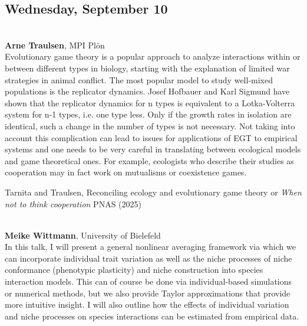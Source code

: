 \documentclass[12pt,a4paper]{article}
\begin{document}
\subsection*{\sffamily Wednesday, September 10}
\bigskip\bigskip
{}\\[1ex]{ \large \textbf{ Arne Traulsen}}, MPI Plön \\[2ex] Evolutionary game theory is a popular approach to analyze interactions within or between different types in biology, starting with the explanation of limited war strategies in animal conflict. The most popular model to study well-mixed populations is the replicator dynamics. Josef Hofbauer and Karl Sigmund have shown that the replicator dynamics for n types is equivalent to a Lotka-Volterra system for n-1 types, i.e. one type less. Only if the growth rates in isolation are identical, such a change in the number of types is not necessary. Not taking into account this complication can lead to issues for applications of EGT to empirical systems and one needs to be very careful in translating between ecological models and game theoretical ones. For example, ecologists who describe their studies as cooperation may in fact work on mutualisms or coexistence games. 

 Tarnita and Traulsen, Reconciling ecology and evolutionary game theory or {\em When not to think cooperation} PNAS (2025) 

\bigskip\bigskip

\\[1ex]{ \large \textbf{ Meike Wittmann}}, University of Bielefeld \\[2ex] In this talk, I will present a general nonlinear averaging framework via which we can incorporate individual trait variation as well as the niche processes of niche conformance (phenotypic plasticity) and niche construction into species interaction models. This can of course be done via individual-based simulations or numerical methods, but we also provide Taylor approximations that provide more intuitive insight. I will also outline how the effects of individual variation and niche processes on species interactions can be estimated from empirical data. 

\bigskip\bigskip
\end{document}
